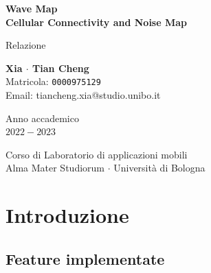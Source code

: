 \documentclass[11pt]{article}
\begin{document}
\begin{titlepage}
    \begin{center}
        \vspace*{5cm}
            
        \Huge
        \textbf{Wave Map}\\
        \huge
        \textbf{Cellular Connectivity and Noise Map}
            
        \vspace{0.5cm}
        \LARGE
        Relazione
            
        \vspace{1cm}
          
		\hfill
		\begin{center}
        	{\large{\bf Xia $\cdot$ Tian Cheng}}\\[-0.2em]
			{\large Matricola: \texttt{0000975129}}\\[-0.2em]
			{\large Email: tiancheng.xia@studio.unibo.it}
        \end{center}
            
        \vspace{4cm}
            
        Anno accademico\\
        $2022 - 2023$
            
        \vspace{0.8cm}
            
            
        \Large
        Corso di Laboratorio di applicazioni mobili\\
        Alma Mater Studiorum $\cdot$ Università di Bologna\\
            
    \end{center}
\end{titlepage}
\newpage

\tableofcontents
\newpage



\section{Introduzione}

\subsection{Feature implementate}
\end{document}
